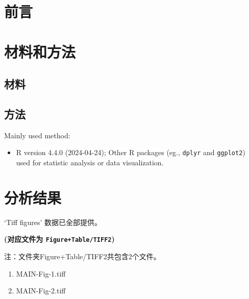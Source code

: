 \documentclass[
]{article}
\providecommand{\tightlist}{%
  \setlength{\itemsep}{0pt}\setlength{\parskip}{0pt}}
\begin{document}
\begin{center}\vspace{1.5cm}\end{center}

\hypertarget{introduction}{%
\section{前言}\label{introduction}}

\hypertarget{methods}{%
\section{材料和方法}\label{methods}}

\hypertarget{ux6750ux6599}{%
\subsection{材料}\label{ux6750ux6599}}

\hypertarget{ux65b9ux6cd5}{%
\subsection{方法}\label{ux65b9ux6cd5}}

Mainly used method:

\begin{itemize}
\tightlist
\item
  R version 4.4.0 (2024-04-24); Other R packages (eg., \texttt{dplyr} and \texttt{ggplot2}) used for statistic analysis or data visualization.
\end{itemize}

\hypertarget{results}{%
\section{分析结果}\label{results}}

\begin{center}\vspace{1.5cm}\end{center}

`Tiff figures' 数据已全部提供。

\textbf{(对应文件为 \texttt{Figure+Table/TIFF2})}

\begin{center}\begin{tcolorbox}[colback=gray!10, colframe=gray!50, width=0.9\linewidth, arc=1mm, boxrule=0.5pt]注：文件夹Figure+Table/TIFF2共包含2个文件。

\begin{enumerate}\tightlist
\item MAIN-Fig-1.tiff
\item MAIN-Fig-2.tiff
\end{enumerate}\end{tcolorbox}
\end{center}
\end{document}
